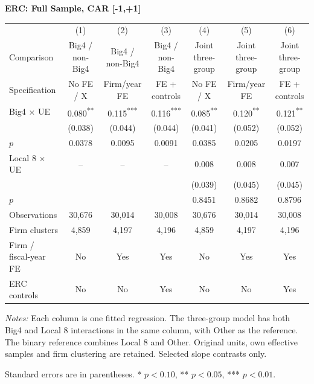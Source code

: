 \documentclass[10pt]{article}
\newcommand{\sym}[1]{\textsuperscript{#1}}
\begin{document}
\begin{minipage}{23.60cm}
\fontsize{10}{12}\selectfont
\setlength{\tabcolsep}{4pt}\renewcommand{\arraystretch}{1.08}
{\large\bfseries ERC: Full Sample, CAR [-1,+1]}\par\medskip
\begin{tabular*}{\linewidth}{@{\extracolsep{\fill}}lcccccc@{}}
\toprule
 & (1) & (2) & (3) & (4) & (5) & (6) \\
Comparison & Big4 / non-Big4 & Big4 / non-Big4 & Big4 / non-Big4 & Joint three-group & Joint three-group & Joint three-group \\
Specification & No FE / X & Firm/year FE & FE + controls & No FE / X & Firm/year FE & FE + controls \\
\midrule
Big4 $\times$ UE & 0.080\sym{**} & 0.115\sym{***} & 0.116\sym{***} & 0.085\sym{**} & 0.120\sym{**} & 0.121\sym{**} \\
 & (0.038) & (0.044) & (0.044) & (0.041) & (0.052) & (0.052) \\
$p$ & 0.0378 & 0.0095 & 0.0091 & 0.0385 & 0.0205 & 0.0197 \\
Local 8 $\times$ UE & -- & -- & -- & 0.008 & 0.008 & 0.007 \\
 &  &  &  & (0.039) & (0.045) & (0.045) \\
$p$ &  &  &  & 0.8451 & 0.8682 & 0.8796 \\
\midrule
Observations & 30,676 & 30,014 & 30,008 & 30,676 & 30,014 & 30,008 \\
Firm clusters & 4,859 & 4,197 & 4,196 & 4,859 & 4,197 & 4,196 \\
Firm / fiscal-year FE & No & Yes & Yes & No & Yes & Yes \\
ERC controls & No & No & Yes & No & No & Yes \\
\bottomrule\end{tabular*}\par\medskip
\fontsize{9}{11}\selectfont\textit{Notes:} Each column is one fitted regression. The three-group model has both Big4 and Local 8 interactions in the same column, with Other as the reference. The binary reference combines Local 8 and Other. Original units, own effective samples and firm clustering are retained. Selected slope contrasts only.
\par Standard errors are in parentheses. * $p<0.10$, ** $p<0.05$, *** $p<0.01$.
\end{minipage}
\end{document}

